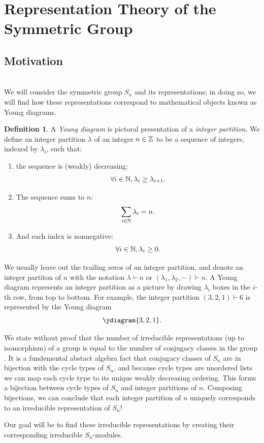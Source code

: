 \documentclass[12pt,twoside]{reedthesis}
\theoremstyle{plain}   %
\theoremstyle{definition}
\newtheorem{defn}{Definition}[section]
\theoremstyle{remark}
\numberwithin{equation}{section}
\begin{document}
  \section{Representation Theory of the Symmetric Group}
  \subsection{Motivation}\label{motivation} \hfill\\
  We will consider the symmetric group $S_n$ and its representations; in doing so, we will find how these representations correspond to mathematical objects known as Young diagrams.
  \begin{defn}
    A \emph{Young diagram} is pictoral presentation of a \emph{integer partition}.
    We define an integer partition $\lambda$ of an integer $n \in \mathbb{Z}$ to be a sequence of integers, indexed by $\lambda_i$, such that:
    \begin{enumerate}
    \item the sequence is (weakly) decreasing:
      \[\forall i \in \mathbb{N}, \lambda_i \geq \lambda_{i+1}.\]
    \item
      The sequence sums to $n$:
      \[ \sum_{i \in \mathbb{N}} \lambda_i = n. \]
    \item
      And each index is nonnegative:
      \[\forall i \in \mathbb{N}, \lambda_i \geq 0.\]
    \end{enumerate}
    We usually leave out the trailing zeros of an integer partition, and denote an integer partiton of $n$ with the notation $\lambda \vdash n$ or $(\lambda_1,\lambda_2,\cdots) \vdash n$.
    A Young diagram represents an integer partition as a picture by drawing $\lambda_i$ boxes in the $i$-th row, from top to bottom.
    For example, the integer partition $(3,2,1) \vdash 6$ is represented by the Young diagram
    \[
      \ydiagram{3,2,1}.
    \]
  \end{defn}
  \par
  We state without proof that the number of irreducible representations (up to isomorphism) of a group is equal to the number of conjugacy classes in
  the group \cite[Proposition 1.10.1]{sagan} . It is a fundemental abstact algebra fact that 
  conjugacy classes of $S_n$ are in bijection with the cycle types of $S_n$,
  and because cycle types are unordered lists we can map each cycle type to its unique weakly decreasing ordering.
  This forms a bijection between cycle types of $S_n$ and integer partitions of $n$.
  Composing bijections, we can conclude that each integer partition of $n$ uniquely corresponds to an irreducible representation of $S_n$! \par
  Our goal will be to find these irreducible representations by creating their corresponding irreducible $S_n$-modules.
\end{document}
